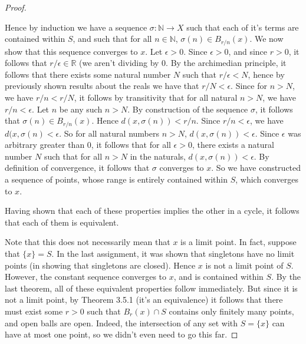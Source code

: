 \documentclass[11pt]{article}
\newcommand{\R}{\mathbb{R}}
\newcommand{\N}{\mathbb{N}}
\theoremstyle{definition}
\begin{document}
\begin{proof}
\begin{itemize}
\begin{itemize}
\end{itemize}
Hence by induction we have a sequence $\sigma:\N \to X$ such that each of it's terms are contained within $S$, and such that for all $n\in \N$, $\sigma(n)\in B_{r/n}(x)$. We now show that this sequence converges to $x$. Let $\epsilon > 0$. Since $\epsilon > 0$, and since $r > 0$, it follows that $r/\epsilon \in \R$ (we aren't dividing by $0$. By the archimedian principle, it follows that there exists some natural number $N$ such that $r/\epsilon < N$, hence by previously shown results about the reals we have that $ r/N < \epsilon $. Since for $n> N$, we have $r/n < r/N$, it follows by transitivity that for all natural $n> N$, we have $r/n < \epsilon$. Let $n$ be any such $n>N$. By construction of the sequence $\sigma$, it follows that $\sigma(n)\in B_{r/n}(x)$. Hence $d(x, \sigma(n)) < r/n$. Since $r/n < \epsilon$, we have $d(x,\sigma(n) < \epsilon$. So for all natural numbers $n>N$, $d(x,\sigma(n)) < \epsilon$. Since $\epsilon $ was arbitrary greater than $0$, it follows that for all $\epsilon > 0$, there exists a natural number $N$ such that for all $n>N$ in the naturals, $d(x,\sigma(n)) < \epsilon$. By definition of convergence, it follows that $\sigma$ converges to $x$. So we have constructed a sequence of points, whose range is entirely contained within $S$, which converges to $x$.

\end{itemize}

Having shown that each of these properties implies the other in a cycle, it follows that each of them is equivalent. 

Note that this does not necessarily mean that $x$ is a limit point. In fact, suppose that $\{x\} = S$. In the last assignment, it was shown that singletons have no limit points (in showing that singletons are closed). Hence $x$ is not a limit point of $S$. However, the constant sequence converges to $x$, and is contained within $S$. By the last theorem, all of these equivalent properties follow immediately. But since it is not a limit point, by Theorem 3.5.1 (it's an equivalence) it follows that there must exist some $r>0$ such that $B_r(x) \cap S$ contains only finitely many points, and open balls are open. Indeed, the intersection of any set with $S = \{x\}$ can have at most one point, so we didn't even need to go this far.
\end{proof} 
\end{document}

